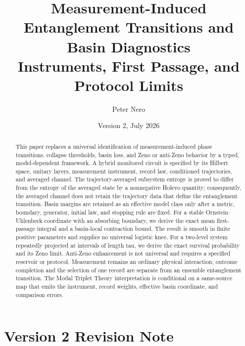 \documentclass[11pt]{article}
\title{\textbf{Measurement-Induced Entanglement Transitions and Basin Diagnostics}\\
\large Instruments, First Passage, and Protocol Limits}
\author{Peter Nero}
\date{Version 2, July 2026}
\begin{document}
\maketitle

\begin{abstract}
This paper replaces a universal identification of measurement-induced
phase transitions, collapse thresholds, basin loss, and Zeno or
anti-Zeno behavior by a typed, model-dependent framework.  A hybrid
monitored circuit is specified by its Hilbert space, unitary layers,
measurement instrument, record law, conditioned trajectories, and
averaged channel.  The trajectory-averaged subsystem entropy is proved
to differ from the entropy of the averaged state by a nonnegative Holevo
quantity; consequently, the averaged channel does not retain the
trajectory data that define the entanglement transition.  Basin margins
are retained as an effective model class only after a metric, boundary,
generator, initial law, and stopping rule are fixed.  For a stable
Ornstein--Uhlenbeck coordinate with an absorbing boundary, we derive the
exact mean first-passage integral and a basin-local contraction bound.
The result is smooth in finite positive parameters and supplies no
universal logistic knee.  For a two-level system repeatedly projected at
intervals of length tau, we derive the exact survival probability and
its Zeno limit.  Anti-Zeno enhancement is not universal and requires a
specified reservoir or protocol.  Measurement remains an ordinary
physical interaction; outcome completion and the selection of one
record are separate from an ensemble entanglement transition.  The Modal
Triplet Theory interpretation is conditional on a same-source map that
emits the instrument, record weights, effective basin coordinate, and
comparison errors.
\end{abstract}

\section*{Version 2 Revision Note}
\end{document}
